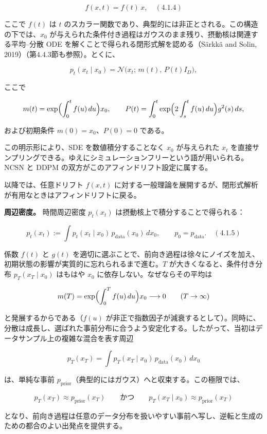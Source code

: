 \[
f(x,t)=f(t)\,x, \quad (4.1.4)
\]


ここで $f(t)$ は $t$ のスカラー関数であり、典型的には非正とされる。この構造の下では、$x_0$ が与えられた条件付き過程はガウスのまま残り、摂動核は関連する平均–分散 ODE を解くことで得られる閉形式解を認める（Särkkä and Solin, 2019）（第4.4.3節も参照）。とくに、

\[
p_t(x_t\mid x_0)=\mathcal{N}\bigl(x_t;\, m(t),\, P(t)I_D\bigr),
\]


ここで

\[
m(t)=\exp\Bigl(\int_0^t f(u)\, du\Bigr)x_0, \qquad
P(t)=\int_0^t\exp\Bigl(2\int_s^t f(u)\, du\Bigr)g^2(s)\, ds,
\]


および初期条件 $m(0)=x_0$、$P(0)=0$ である。

この明示形により、SDE を数値積分することなく $x_0$ が与えられた $x_t$ を直接サンプリングできる。ゆえにシミュレーションフリーという語が用いられる。NCSN と DDPM の双方がこのアフィンドリフト設定に属する。

以降では、任意ドリフト $f(x,t)$ に対する一般理論を展開するが、閉形式解析が有用なときはアフィンドリフトに戻る。

\textbf{周辺密度。} 時間周辺密度 $p_t(x_t)$ は摂動核上で積分することで得られる：

\[
p_t(x_t) := \int p_t(x_t\mid x_0)\, p_{\mathrm{data}}(x_0)\, dx_0, \qquad p_0=p_{\mathrm{data}}. \quad (4.1.5)
\]


係数 $f(t)$ と $g(t)$ を適切に選ぶことで、前向き過程は徐々にノイズを加え、初期状態の影響が実質的に忘れられるまで進む。$T$ が大きくなると、条件付き分布 $p_T(x_T\mid x_0)$ はもはや $x_0$ に依存しない。なぜならその平均は

\[
m(T)=\exp\Bigl(\int_0^T f(u)\, du\Bigr)x_0 \longrightarrow 0 \qquad (T\to\infty)
\]


と発展するからである（$f(u)$ が非正で指数因子が減衰するとして）。同時に、分散は成長し、選ばれた事前分布に合うよう安定化する。したがって、当初はデータサンプル上の複雑な混合を表す周辺

\[
p_T(x_T)=\int p_T(x_T\mid x_0)\, p_{\mathrm{data}}(x_0)\, dx_0
\]


は、単純な事前 $p_{\mathrm{prior}}$（典型的にはガウス）へと収束する。この極限では、

\[
p_T(x_T)\approx p_{\mathrm{prior}}(x_T) \qquad\text{かつ}\qquad p_T(x_T\mid x_0)\approx p_{\mathrm{prior}}(x_T)
\]


となり、前向き過程は任意のデータ分布を扱いやすい事前へ写し、逆転と生成のための都合のよい出発点を提供する。

